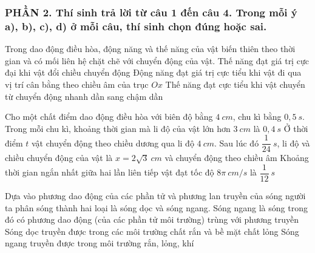 \subsubsection*{PHẦN 2. Thí sinh trả lời từ câu 1 đến câu 4. Trong mỗi ý a), b), c), d) ở mỗi câu, thí sinh chọn đúng hoặc sai.}
\setcounter{ex}{0}
\begin{ex}
	Trong dao động điều hòa, động năng và thế năng của vật biến thiên theo thời gian và có mối liên hệ chặt chẽ với chuyển động của vật.
	{\True Thế năng đạt giá trị cực đại khi vật đổi chiều chuyển động}
	{Động năng đạt giá trị cực tiểu khi vật đi qua vị trí cân bằng theo chiều âm của trục $Ox$}
	{\True Thế năng đạt cực tiểu khi vật chuyển từ chuyển động nhanh dần sang chậm dần}
\end{ex}


\begin{ex}
	Cho một chất điểm dao động điều hòa với biên độ bằng $4 \ cm$, chu kì bằng $0,5 \ s$.
	{Trong mỗi chu kì, khoảng thời gian mà li độ của vật lớn hơn $3 \ cm$ là $0,4 \ s$}
	{\True Ở thời điểm $t$ vật chuyển động theo chiều dương qua li độ $4 \ cm$. Sau lúc đó $\dfrac{1}{24}\ s$, li độ và chiều chuyển động của vật là $x=2 \sqrt{3}\ cm$ và chuyển động theo chiều âm}
	{\True Khoảng thời gian ngắn nhất giữa hai lần liên tiếp vật đạt tốc độ $8 \pi\ cm/s$ là $\dfrac{1}{12}\ s$}
\end{ex}
\begin{ex}
	Dựa vào phương dao động của các phần tử và phương lan truyền của sóng người ta phân sóng thành hai loại là sóng dọc và sóng ngang.
	{Sóng ngang là sóng trong đó có phương dao động (của các phần tử môi trường) trùng với phương truyền} 
	{\True Sóng dọc truyền được trong các môi trường chất rắn và bề mặt chất lỏng}
	{Sóng ngang truyền được trong môi trường rắn, lỏng, khí}
\end{ex}

